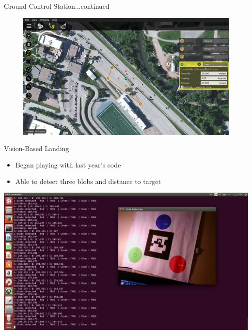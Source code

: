 \documentclass[11pt]{beamer}
\begin{document}
\begin{frame}{Ground Control Station...continued}
\begin{figure}
\includegraphics[width=1\textwidth]{images/mission}
\end{figure}
\end{frame}

\begin{frame}{Vision-Based Landing}
	\begin{itemize}
		\item Began playing with last year's code
		\item Able to detect three blobs and distance to target
	\end{itemize}
	\includegraphics[width=1\textwidth]{images/coolpic}
\end{frame}
\end{document}

